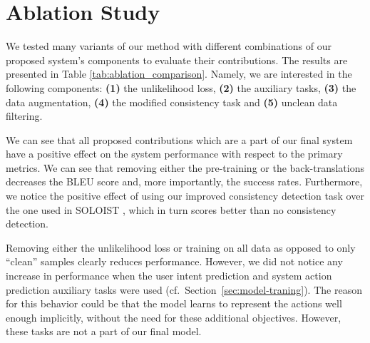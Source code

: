 \documentclass[11pt,a4paper]{article}
\begin{document}
\section{Ablation Study}
We tested many variants of our method with different combinations of our proposed system's components to evaluate their contributions. The results are presented in Table \ref{tab:ablation_comparison}.
Namely, we are interested in the following components:
\textbf{(1)} the unlikelihood loss, \textbf{(2)} the auxiliary tasks, \textbf{(3)} the data augmentation, \textbf{(4)} the modified consistency task and \textbf{(5)} unclean data filtering.

We can see that all proposed contributions which are a part of our final system have a positive effect on the system performance with respect to the primary metrics.
We can see that removing either the pre-training or the back-translations decreases the BLEU score and, more importantly, the success rates. Furthermore, we notice the positive effect of using our improved consistency detection task over the one used in SOLOIST \cite{peng2020}, which in turn scores better than no consistency detection. 

Removing either the unlikelihood loss or training on all data as opposed to only “clean” samples clearly reduces performance.
However, we did not notice any increase in performance when the user intent prediction and system action prediction auxiliary tasks were used (cf.\ Section~\ref{sec:model-traning}).
The reason for this behavior could be that the model learns to represent the actions well enough implicitly, without the need for these additional objectives.
However, these tasks are not a part of our final model.

\end{document}
